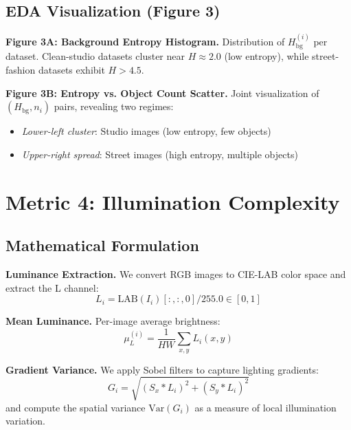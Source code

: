 \documentclass[runningheads]{llncs}
\newcommand{\Var}{\mathrm{Var}}
\begin{document}
\subsection{EDA Visualization (Figure 3)}

\textbf{Figure 3A: Background Entropy Histogram.} Distribution of $H_{\text{bg}}^{(i)}$ per dataset. Clean-studio datasets cluster near $H \approx 2.0$ (low entropy), while street-fashion datasets exhibit $H > 4.5$.

\textbf{Figure 3B: Entropy vs. Object Count Scatter.} Joint visualization of $(H_{\text{bg}}, n_i)$ pairs, revealing two regimes:
\begin{itemize}
    \item \textit{Lower-left cluster}: Studio images (low entropy, few objects)
    \item \textit{Upper-right spread}: Street images (high entropy, multiple objects)
\end{itemize}


\section{Metric 4: Illumination Complexity}
\label{sec:m4_illumination}

\subsection{Mathematical Formulation}

\textbf{Luminance Extraction.} We convert RGB images to CIE-LAB color space and extract the L channel:
\begin{equation}
    L_i = \text{LAB}(I_i)[:, :, 0] / 255.0 \in [0, 1]
\end{equation}

\textbf{Mean Luminance.} Per-image average brightness:
\begin{equation}
    \mu_L^{(i)} = \frac{1}{HW}\sum_{x,y} L_i(x, y)
\end{equation}

\textbf{Gradient Variance.} We apply Sobel filters to capture lighting gradients:
\begin{equation}
    G_i = \sqrt{(S_x * L_i)^2 + (S_y * L_i)^2}
\end{equation}
and compute the spatial variance $\Var(G_i)$ as a measure of local illumination variation.
\end{document}
